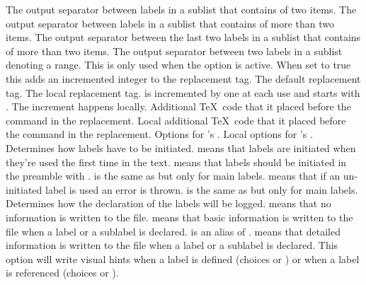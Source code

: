 \documentclass[load-preamble+,babel-options={ngerman,british,american}]{cnltx-doc}
\begin{document}
\begin{options}
    The output separator between labels in a sublist that contains of two
    items.
  \Default{,}
    The output separator between labels in a sublist that contains of more
    than two items.
  \Default{,}
    The output separator between the last two labels in a sublist that
    contains of more than two items.
  \Default{--}
    The output separator between two labels in a sublist denoting a range.
    This is only used when the option  is active.
    When set to true this adds an incremented integer to the replacement tag.
    The default replacement tag.
    The local replacement tag.   is incremented by one at each
    use and starts with .  The increment happens locally.
    Additional \TeX\ code that it placed before the  command in the
    replacement.
    Local additional \TeX\ code that it placed before the  command in
    the replacement.
    Options for 's .
    Local options for 's .
    Determines how labels have to be initiated.   means that
    labels are initiated when they're used the first time in the text.
     means that labels should be initiated in the preamble with
    .   is the same as  but only for main
    labels.   means that if an un-initiated label is used an
    error is thrown.   is the same as  but only
    for main labels.
    Determines how the declaration of the labels will be logged.  
    means that no information is written to the  file.  
    means that basic information is written to the  file when a
    label or a sublabel is declared.   is an alias of
    .   means that detailed information is written to
    the  file when a label or a sublabel is declared.
    This option will write visual hints when a label is defined (choices
     or ) or when a label is referenced (choices
     or ).
\end{options}
\end{document}
